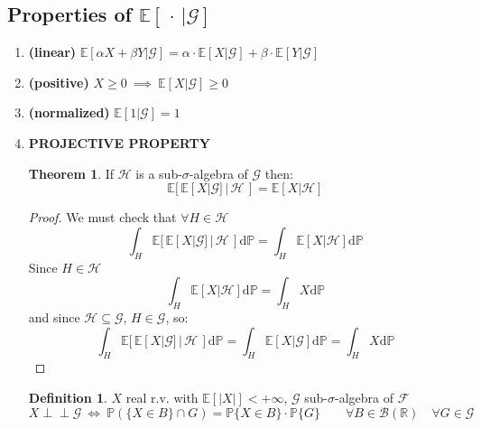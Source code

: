 \documentclass[10pt,a4paper]{article}
\theoremstyle{definition}
\newtheorem{defi}{Definition}[section]
\newtheorem{teo}{Theorem}[section]
\newcommand{\indep}{\perp \!\!\! \perp}
\begin{document}
\subsection{Properties of $\mathbb{E}[\, \cdot\, |\mathcal{G}]$}
\begin{enumerate}
	\item \textbf{(linear)} $\mathbb{E}[\alpha X+\beta Y|\mathcal{G}] = \alpha\cdot\mathbb{E}[X|\mathcal{G}]+\beta\cdot\mathbb{E}[Y|\mathcal{G}]$
	\item \textbf{(positive)} $X\geq 0 \ \implies \ \mathbb{E}[X|\mathcal{G}]\geq 0$
	\item \textbf{(normalized)} $\mathbb{E}[1|\mathcal{G}]=1$
	\item \textbf{PROJECTIVE PROPERTY} 
	\begin{teo}
		If $ \mathcal{H}$ is a sub-$\sigma$-algebra of  $\mathcal{G}$ then:
		\begin{equation*}
		\mathbb{E}[\, \mathbb{E}[X|\mathcal{G}]\, |\,\mathcal{H}\,]=\mathbb{E}[ X |\mathcal{H}]
		\end{equation*}
	\end{teo}
\begin{proof}
	We must check that $\forall H \in\mathcal{H}$
	\begin{equation*}
		\int_{H}\mathbb{E}[\, \mathbb{E}[X|\mathcal{G}]\, |\,\mathcal{H}\,]\mathrm{d}\mathbb{P}=	
		\int_{H}\mathbb{E}[X|\mathcal{H}]\mathrm{d}\mathbb{P}
	\end{equation*}
Since $H\in \mathcal{H}$ 
\begin{equation*}
	\int_{H}\mathbb{E}[X|\mathcal{H}]\mathrm{d}\mathbb{P}=\int_{H}X\mathrm{d}\mathbb{P}
\end{equation*}
and since $\mathcal{H}\subseteq\mathcal{G}$, $H\in\mathcal{G}$, so:
\begin{equation*}
		\int_{H}\mathbb{E}[\, \mathbb{E}[X|\mathcal{G}]\, |\,\mathcal{H}\,]\mathrm{d}\mathbb{P}=	\int_{H}\mathbb{E}[X|\mathcal{G}]\mathrm{d}\mathbb{P}=\int_{H}X\mathrm{d}\mathbb{P}
\end{equation*}
\end{proof}
\begin{defi}
	$X$ real r.v. with $\mathbb{E}[|X|]<+\infty $,  $ \mathcal{G}$ sub-$\sigma$-algebra of  $\mathcal{F} $ 
	\begin{equation*}
		X \indep \mathcal{G} \ \iff \ \mathbb{P}\left(\{X\in B\}\cap G\right)=\mathbb{P}\{X\in B\}\cdot \mathbb{P}\{G\} \qquad \forall B \in \mathcal{B}(\mathbb{R}) \quad \forall G\in  \mathcal{G}

\end{equation*}
\end{defi}
\end{enumerate}
\end{document}
